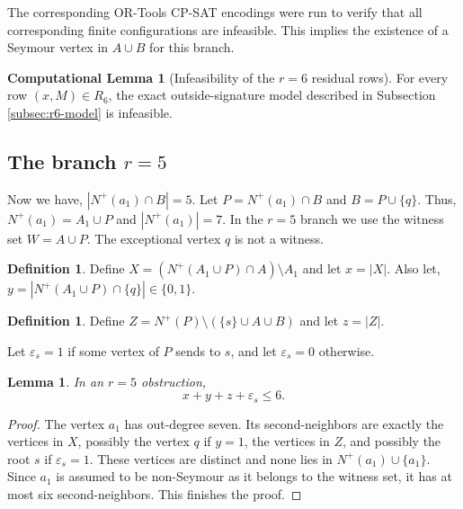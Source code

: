 \documentclass[a4paper,fleqn]{cas-sc}
\newtheorem{lemma}[theorem]{Lemma}
\theoremstyle{definition}
\newtheorem{definition}[theorem]{Definition}
\newtheorem{computationallemma}{Computational Lemma}
\newcommand{\arp}[1]{\textcolor{red}{ArP: #1}}
\begin{document}
The corresponding OR-Tools CP-SAT encodings were run to verify that all corresponding finite configurations are infeasible.
This implies the existence of a Seymour vertex in $A\cup B$ for this branch.

\begin{computationallemma}[Infeasibility of the $r=6$ residual rows]\label{cl:r6}
For every row $(x,M)\in R_6$, the exact outside-signature model described in Subsection \ref{subsec:r6-model} is infeasible.
\end{computationallemma}

\subsection{The branch $r=5$}
Now we have, $|N^+(a_1)\cap B|=5$. Let $P=N^+(a_1)\cap B$ and $B=P\cup\{q\}$. Thus, $N^+(a_1)=A_1\cup P$ and $|N^+(a_1)|=7$. In the $r=5$ branch we use the witness set $W=A\cup P$. The exceptional vertex $q$ is not a witness.

\begin{definition}
    Define $X=(N^+(A_1\cup P)\cap A)\setminus A_1$ and let $x=|X|$. Also let, $y=|N^+(A_1\cup P)\cap\{q\}|\in\{0,1\}$. 
\end{definition}

\begin{definition}
    Define $Z=N^+(P)\setminus(\{s\}\cup A\cup B)$ and let $z=|Z|$.
\end{definition}

Let $\varepsilon_s=1$ if some vertex of $P$ sends to $s$, and let $\varepsilon_s=0$ otherwise.

\begin{lemma}\label{lem:r5-a1}
In an $r=5$ obstruction,
\[
x+y+z+\varepsilon_s\le 6.
\]
\end{lemma}
\begin{proof}
The vertex $a_1$ has out-degree seven.  Its second-neighbors are exactly the vertices in $X$, possibly the vertex $q$ if $y=1$, the vertices in $Z$, and possibly the root $s$ if $\varepsilon_s=1$.  These vertices are distinct and none lies in $N^+(a_1)\cup\{a_1\}$.  Since $a_1$ is assumed to be non-Seymour as it belongs to the witness set, it has at most six second-neighbors. This finishes the proof.
\end{proof}
\end{document}
